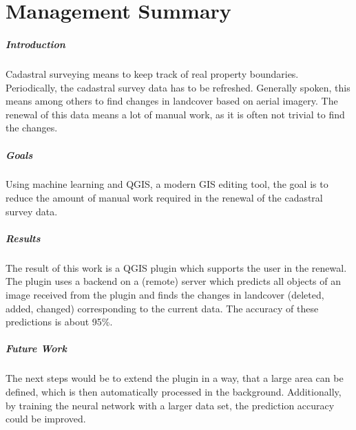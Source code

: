 
\chapter*{Management Summary}

\paragraph*{Introduction}
Cadastral surveying means to keep track of real property boundaries. Periodically, the cadastral survey data has to be refreshed. Generally spoken, this means among others to find changes in landcover based on aerial imagery. The renewal of this data means a lot of manual work, as it is often not trivial to find the changes.

\paragraph*{Goals}
Using machine learning and QGIS, a modern GIS editing tool, the goal is to reduce the amount of manual work required in the renewal of the cadastral survey data.

\paragraph*{Results}
The result of this work is a QGIS plugin which supports the user in the renewal. The plugin uses a backend on a (remote) server which predicts all objects of an image received from the plugin and finds the changes in landcover (deleted, added, changed) corresponding to the current data. The accuracy of these predictions is about 95\%. 

\paragraph*{Future Work}
The next steps would be to extend the plugin in a way, that a large area can be defined, which is then automatically processed in the background. Additionally, by training the neural network with a larger data set, the prediction accuracy could be improved.